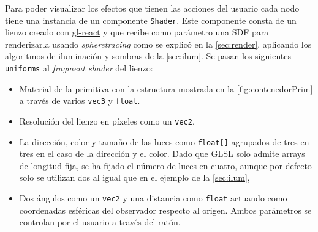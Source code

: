Para poder visualizar los efectos que tienen las acciones del usuario cada nodo tiene una instancia de un componente \texttt{Shader}. Este componente consta de un lienzo creado con \href{https://github.com/gre/gl-react}{gl-react} y que recibe como parámetro una SDF para renderizarla usando \textit{spheretracing} como se explicó en la \autoref{sec:render}, aplicando los algoritmos de iluminación y sombras de la \autoref{sec:ilum}. Se pasan los siguientes \texttt{uniforms} al \textit{fragment shader} del lienzo: 
\begin{itemize}
    \item Material de la primitiva con la estructura mostrada en la \autoref{fig:contenedorPrim} a través de varios \texttt{vec3} y \texttt{float}. 
    \item Resolución del lienzo en píxeles como un \texttt{vec2}.
    \item La dirección, color y tamaño de las luces como \texttt{float[]} agrupados de tres en tres en el caso de la dirección y el color. Dado que GLSL solo admite arrays de longitud fija, se ha fijado el número de luces en cuatro, aunque por defecto solo se utilizan dos al igual que en el ejemplo de la \autoref{sec:ilum},
    \item Dos ángulos como un \texttt{vec2} y una distancia como \texttt{float} actuando como coordenadas esféricas del observador respecto al origen. Ambos parámetros se controlan por el usuario a través del ratón.
\end{itemize}

